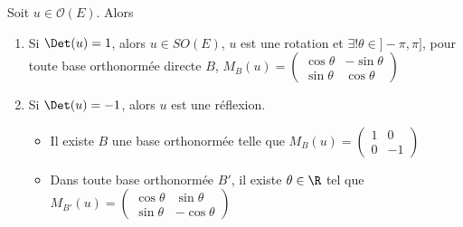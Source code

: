 \begin{proposition}{}{}
    Soit $u \in \mathcal O(E)$. Alors 
    \begin{enumerate}
        \item Si $\Det(u) = 1$, alors $u \in SO(E)$, $u$ est une rotation 
        et $\exists ! \theta \in ]- \pi, \pi]$, pour toute base orthonormée directe 
        $B$, $M_B(u) = \begin{pmatrix}
            \cos \theta & -\sin \theta \\
            \sin \theta & \cos \theta
        \end{pmatrix}$
        \item Si $\Det(u) = -1$, alors $u$ est une réflexion. 
        \begin{itemize}
            \item Il existe $B$ une base orthonormée telle que $M_B(u) = \begin{pmatrix}
                1 & 0 \\
                0 & -1
            \end{pmatrix}$
            \item Dans toute base orthonormée $B'$, il existe $\theta \in \R$ tel que $M_{B'}(u) = \begin{pmatrix}
                \cos \theta & \sin \theta \\
                \sin \theta & -\cos \theta
            \end{pmatrix}$
        \end{itemize}
    \end{enumerate}
\end{proposition}


